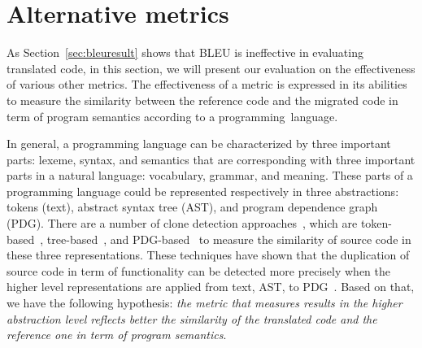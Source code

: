 \section{Alternative metrics}
\label{sec:alternatives}
%

As Section~\ref{sec:bleuresult} shows that BLEU is ineffective in
evaluating translated code, in this section, we will present our
evaluation on the effectiveness of various other metrics. The
effectiveness of a metric is expressed in its abilities to measure the
similarity between the reference code and the migrated code in term of
program semantics according to a programming~language.


In general, a programming language can be characterized by three
important parts: lexeme, syntax, and semantics that are corresponding
with three important parts in a natural language: vocabulary, grammar,
and meaning.
These parts of a programming language could be represented respectively in three 
abstractions: tokens (text), abstract syntax tree (AST), and program 
dependence graph (PDG).
%
There are a number of clone detection approaches~\cite{clone-tse07},
which are token-based~\cite{ccfinder},
tree-based~\cite{baxter98,deckard}, and PDG-based~\cite{deckard2} to
measure the similarity of source code in these three representations.
These techniques have shown that the duplication of source code in
term of functionality can be detected more precisely when the higher
level representations are applied from text, AST, to
PDG~\cite{clone-tse07,deckard2}.
Based on that, we have the following hypothesis: \textit{the metric
  that measures results in the higher abstraction level reflects
  better the similarity of the translated code and the reference one
  in term of program semantics}.


